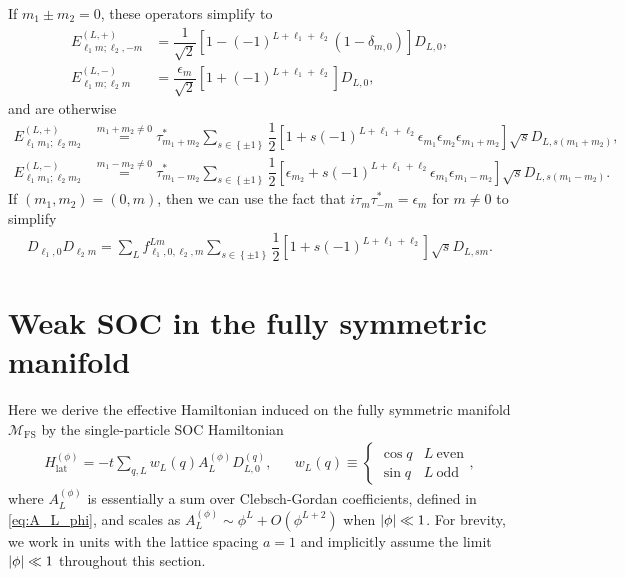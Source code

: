 \documentclass[nofootinbib,notitlepage,11pt]{revtex4-2}
\renewcommand{\t}{\text} %
\newcommand{\f}[2]{\dfrac{#1}{#2}} %
\newcommand{\p}[1]{\left(#1\right)} %
\renewcommand{\sp}[1]{\left[#1\right]} %
\renewcommand{\set}[1]{\left\{#1\right\}} %
\newcommand{\1}{\mathds{1}}
\newcommand{\M}{\mathcal{M}}
\newcommand{\FS}{\text{FS}}
\begin{document}
If $m_1\pm m_2=0$, these operators simplify to
\begin{align}
  E_{\ell_1 m;\ell_2,-m}^{(L,+)}
  &= \f1{\sqrt{2}} \sp{1 - \p{-1}^{L+\ell_1+\ell_2}
    \p{1-\delta_{m,0}}} D_{L,0}, \\
  E_{\ell_1 m;\ell_2 m}^{(L,-)}
  &= \f{\epsilon_m}{\sqrt{2}}
  \sp{1 + \p{-1}^{L+\ell_1+\ell_2}} D_{L,0},
\end{align}
and are otherwise
\begin{align}
  E_{\ell_1 m_1;\ell_2 m_2}^{(L,+)}
  &\stackrel{m_1+m_2\ne0}{=}
  \tau_{m_1+m_2}^* \sum_{s\in\set{\pm1}}
  \f12 \sp{1 + s \p{-1}^{L+\ell_1+\ell_2}
    \epsilon_{m_1} \epsilon_{m_2} \epsilon_{m_1+m_2}}
  \sqrt{s} D_{L,s\p{m_1+m_2}}, \\
  E_{\ell_1 m_1;\ell_2 m_2}^{(L,-)}
  &\stackrel{m_1-m_2\ne0}{=}
  \tau_{m_1-m_2}^* \sum_{s\in\set{\pm1}}
  \f12 \sp{\epsilon_{m_2} + s \p{-1}^{L+\ell_1+\ell_2}
    \epsilon_{m_1} \epsilon_{m_1-m_2}}
  \sqrt{s} D_{L,s\p{m_1-m_2}}.
\end{align}
If $\p{m_1,m_2}=\p{0,m}$, then we can use the fact that
$i\tau_m\tau_{-m}^*=\epsilon_m$ for $m\ne0$ to simplify
\begin{align}
  D_{\ell_1,0} D_{\ell_2 m}
  = \sum_L f_{\ell_1,0,\ell_2,m}^{Lm}
  \sum_{s\in\set{\pm1}} \f12 \sp{1 + s \p{-1}^{L+\ell_1+\ell_2}}
  \sqrt{s} D_{L,sm}.
\end{align}

\section{Weak SOC in the fully symmetric manifold}
\label{sec:SOC_pert}

Here we derive the effective Hamiltonian induced on the fully
symmetric manifold $\M_\FS$ by the single-particle SOC Hamiltonian
\begin{align}
  H_{\t{lat}}^{(\phi)}
  = -t \sum_{q,L} w_L\p{q} A_L^{(\phi)} D_{L,0}^{(q)},
  &&
  w_L\p{q} \equiv
  \begin{cases}
    \cos q & L~\t{even} \\
    \sin q & L~\t{odd}
  \end{cases},
\end{align}
where $A_L^{(\phi)}$ is essentially a sum over Clebsch-Gordan
coefficients, defined in \eqref{eq:A_L_phi}, and scales as
$A_L^{(\phi)} \sim \phi^L + O\p{\phi^{L+2}}$ when $\abs{\phi}\ll1$.
For brevity, we work in units with the lattice spacing $a=1$ and
implicitly assume the limit $\abs{\phi}\ll1$ throughout this section.
\end{document}
